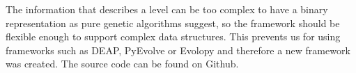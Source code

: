 \documentclass[runningheads,a4paper]{llncs}
\begin{document}


The information that describes a level can be too complex to have a binary 
representation as pure genetic algorithms suggest, so the framework should be 
flexible enough to support complex data structures. This prevents us for using 
frameworks such as DEAP\cite{fortin2012deap}, PyEvolve\cite{perone2009pyevolve} 
or Evolopy\cite{evolopy} and therefore a new framework was created. The source 
code can be found on Github\cite{ab-level}.



\end{document}
